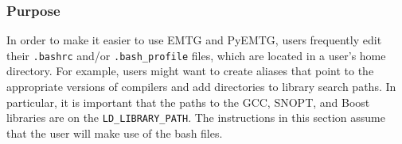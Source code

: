 
\subsubsection{Purpose}
In order to make it easier to use \ac{EMTG} and PyEMTG, users frequently edit their \texttt{.bashrc} and/or \texttt{.bash\_profile} files, which are located in a user's home directory. For example, users might want to create aliases that point to the appropriate versions of compilers and add directories to library search paths. In particular, it is important that the paths to the \ac{GCC}, \ac{SNOPT}, and Boost libraries are on the \texttt{LD\_LIBRARY\_PATH}. The instructions in this section assume that the user will make use of the bash files.

